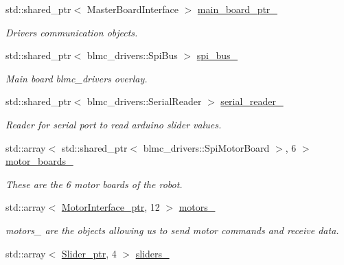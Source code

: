 \begin{DoxyCompactItemize}
std\+::shared\+\_\+ptr$<$ Master\+Board\+Interface $>$ \hyperlink{classblmc__robots_1_1Solo12_a2675d6567258d0f02d387e228a6e85e1}{main\+\_\+board\+\_\+ptr\+\_\+}
\begin{DoxyCompactList}\small\item\em Drivers communication objects. \end{DoxyCompactList}\item 
std\+::shared\+\_\+ptr$<$ blmc\+\_\+drivers\+::\+Spi\+Bus $>$ \hyperlink{classblmc__robots_1_1Solo12_a416708664f404b0d140e02fe8b90bd00}{spi\+\_\+bus\+\_\+}
\begin{DoxyCompactList}\small\item\em Main board blmc\+\_\+drivers overlay. \end{DoxyCompactList}\item 
\mbox{\label{classblmc__robots_1_1Solo12_a640f378577e818ae36f96145760edd65}} 
std\+::shared\+\_\+ptr$<$ blmc\+\_\+drivers\+::\+Serial\+Reader $>$ \hyperlink{classblmc__robots_1_1Solo12_a640f378577e818ae36f96145760edd65}{serial\+\_\+reader\+\_\+}
\begin{DoxyCompactList}\small\item\em Reader for serial port to read arduino slider values. \end{DoxyCompactList}\item 
std\+::array$<$ std\+::shared\+\_\+ptr$<$ blmc\+\_\+drivers\+::\+Spi\+Motor\+Board $>$, 6 $>$ \hyperlink{classblmc__robots_1_1Solo12_a84c520852a2ebd410eff9795e37473b3}{motor\+\_\+boards\+\_\+}
\begin{DoxyCompactList}\small\item\em These are the 6 motor boards of the robot. \end{DoxyCompactList}\item 
std\+::array$<$ \hyperlink{common__header_8hpp_ae1a0f9992bc8fbbc1943d887f517c180}{Motor\+Interface\+\_\+ptr}, 12 $>$ \hyperlink{classblmc__robots_1_1Solo12_a91e6592fb8a24aabb9a9795cccc130cf}{motors\+\_\+}
\begin{DoxyCompactList}\small\item\em motors\+\_\+ are the objects allowing us to send motor commands and receive data. \end{DoxyCompactList}\item 
std\+::array$<$ \hyperlink{common__header_8hpp_a4cb9a95e8b2c0bf237ce29f5252c7b73}{Slider\+\_\+ptr}, 4 $>$ \hyperlink{classblmc__robots_1_1Solo12_a4119af8c0b732d5559f8d71a9714ac29}{sliders\+\_\+}

\end{DoxyCompactItemize}
